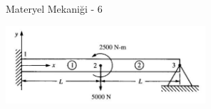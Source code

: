 \documentclass[12pt,fleqn]{article}\usepackage{../../common}
\begin{document}
Materyel Mekaniği - 6

\includegraphics[width=20em]{phy_020_strs_06_01.jpg}
\end{document}
